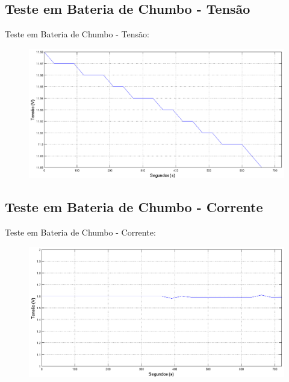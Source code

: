 \documentclass{beamer}
\begin{document}
\subsection{Teste em Bateria de Chumbo - Tensão}
\begin{frame}
  Teste em Bateria de Chumbo - Tensão:
        \begin{figure}
          \centering
          \includegraphics[width=1\linewidth]{energia_3}
        \end{figure}
\end{frame}

\subsection{Teste em Bateria de Chumbo - Corrente}
\begin{frame}
  Teste em Bateria de Chumbo - Corrente:
        \begin{figure}
          \centering
          \includegraphics[width=1\linewidth]{energia_4}
        \end{figure}
\end{frame}
\end{document}
